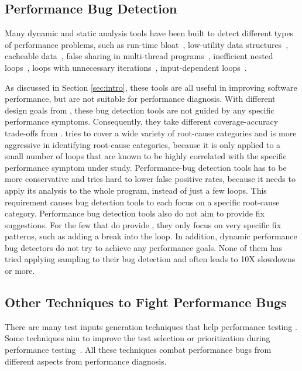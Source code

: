 \subsection{Performance Bug Detection}

Many dynamic and static analysis tools have been built to detect different
types of performance problems, such as 
run-time bloat~\cite{Dufour:2008:STC:1453101.1453111, Xu:2009:GFP:1542476.1542523, Xu:2010:DIC:1806596.1806616}, 
low-utility data structures~\cite{Xu:2010:FLD:1806596.1806617}, 
cacheable data~\cite{Cachetor}, false sharing in
multi-thread programs~\cite{Liu:2011:SPD:2048066.2048070},
inefficient nested loops~\cite{Alabama},
loops with unnecessary iterations~\cite{CARAMEL,IsilDillig.PLDI15},
input-dependent loops~\cite{xiao13:context}. 

As discussed in 
Section \ref{sec:intro}, these tools are all useful in improving software
performance, but are not suitable for performance diagnosis.
With different design goals from \Tool, these bug detection tools are not 
guided by any specific
performance symptoms. Consequently, they take different coverage-accuracy
trade-offs from \Tool. \Tool tries to cover a wide variety of root-cause 
categories and is more aggressive in identifying root-cause categories, because
it is only applied to a small number of loops that are known to be highly
correlated with the specific performance symptom under study.
Performance-bug detection tools has to be more conservative and tries hard
to lower false positive rates, because it needs to apply its analysis to the
whole program, instead of just a few loops. This requirement causes bug
detection tools to each focus on a specific root-cause category.
Performance bug detection tools also do not aim to provide fix suggestions.
For the few that do provide \cite{CARAMEL}, they only focus on very specific
fix patterns, such as adding a break into the loop. 
In addition, dynamic performance bug detectors do not try to achieve any
performance goals. None of them has tried applying sampling to their
bug detection and often leads to 10X slowdowns or more.

\subsection{Other Techniques to Fight Performance Bugs}

There are many test inputs generation techniques that help
performance testing 
\cite{WISE, EventBreak, SpeedGun}.
Some techniques aim to improve the test selection or prioritization during 
performance testing~\cite{Forepost,Huang:2014:PRT:2568225.2568232}.  
All these techniques combat performance bugs from different aspects from performance diagnosis.
